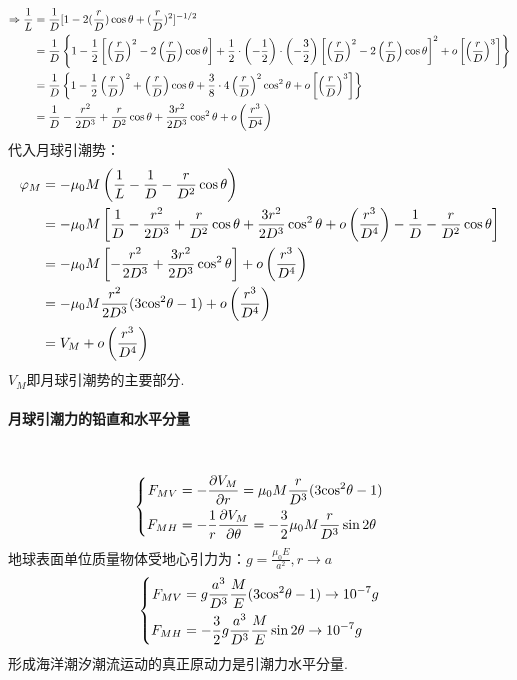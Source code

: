 \documentclass[a4paper,12pt]{article}
\begin{document}
    \[
        \begin{aligned}
            \Rightarrow {1 \over L} &= {1 \over D}{[1 - 2({r \over D})\cos \theta  + {({r \over D})^2}]^{ - 1/2}}\\
            &= \frac{1}{D}\left\{1-\frac{1}{2}\left[\left(\frac{r}{D}\right)^2-2\left(\frac{r}{D}\right)\cos\theta\right]+\frac{1}{2}\cdot\left(-\frac{1}{2}\right)\cdot\left(-\frac{3}{2}\right)\left[\left(\frac{r}{D}\right)^2-2\left(\frac{r}{D}\right)\cos\theta\right]^2+o\left[\left(\frac{r}{D}\right)^3\right] \right\}\\
            &= \frac{1}{D}\left\{1-\frac{1}{2}\left(\frac{r}{D}\right)^2+\left(\frac{r}{D}\right)\cos\theta+\frac{3}{8}\cdot 4\left(\frac{r}{D}\right)^2\cos^2\theta +o\left[\left(\frac{r}{D}\right)^3\right]\right\}\\
            &=\frac{1}{D}-\frac{r^2}{2D^3}+\frac{r}{D^2}\cos\theta+\frac{3r^2}{2D^3}\cos^2\theta+o\left(\frac{r^3}{D^4}\right)
        \end{aligned}
    \]
    代入月球引潮势：
    \[
        \begin{aligned}
            {\varphi _M} &=  - {\mu _0}M\left({1 \over L} - {1 \over D} - {r \over {{D^2}}}\cos \theta \right)\\
            &= - {\mu _0}M\left[\frac{1}{D}-\frac{r^2}{2D^3}+\frac{r}{D^2}\cos\theta+\frac{3r^2}{2D^3}\cos^2\theta+o\left(\frac{r^3}{D^4}\right) - {1 \over D} - {r \over {{D^2}}}\cos \theta \right]\\
            &= - {\mu _0}M\left[-\frac{r^2}{2D^3}+\frac{3r^2}{2D^3}\cos^2\theta \right]+o\left(\frac{r^3}{D^4}\right)\\
            &= - {\mu _0}M{{{r^2}} \over {2{D^3}}}(3{\cos ^2}\theta  - 1)+o\left(\frac{r^3}{D^4}\right)\\
            &= V_M+o\left(\frac{r^3}{D^4}\right)
        \end{aligned}
    \]
    $\displaystyle V_M$即月球引潮势的主要部分.
    \paragraph{月球引潮力的铅直和水平分量}~{}
    \[
        \left\{
            \begin{aligned}
               {F_{MV}} &=  - {{\partial {V_M}} \over {\partial r}} = {\mu _0}M{r \over {{D^3}}}(3{\cos ^2}\theta  - 1)\\
               {F_{MH}} &=  - {1 \over r}{{\partial {V_M}} \over {\partial \theta }} =  - {3 \over 2}{\mu _0}M{r \over {{D^3}}}\sin 2\theta
            \end{aligned}
        \right.
    \]
    地球表面单位质量物体受地心引力为：$\displaystyle g=\frac{\mu_0 E}{a^2},r\rightarrow a$\\
    \[
        \left\{
            \begin{aligned}
              {F_{MV}} &= g{{{a^3}} \over {{D^3}}}{M \over E}(3{\cos ^2}\theta  - 1) \to {10^{ - 7}}g\\
              {F_{MH}} &=  - {3 \over 2}g{{{a^3}} \over {{D^3}}}{M \over E}\sin 2\theta  \to {10^{ - 7}}g
            \end{aligned}
        \right.
    \]
    形成海洋潮汐潮流运动的真正原动力是引潮力水平分量.
\end{document}
